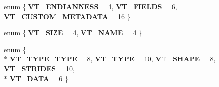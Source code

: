 \begin{DoxyCompactItemize}
\item 
enum \{ {\bfseries V\+T\+\_\+\+E\+N\+D\+I\+A\+N\+N\+E\+SS} = 4, 
{\bfseries V\+T\+\_\+\+F\+I\+E\+L\+DS} = 6, 
{\bfseries V\+T\+\_\+\+C\+U\+S\+T\+O\+M\+\_\+\+M\+E\+T\+A\+D\+A\+TA} = 16
 \}\hypertarget{structorg_1_1apache_1_1arrow_1_1flatbuf_1_1FLATBUFFERS__FINAL__CLASS_ae011c1116f06df235fe2242e20bdbc9e}{}\label{structorg_1_1apache_1_1arrow_1_1flatbuf_1_1FLATBUFFERS__FINAL__CLASS_ae011c1116f06df235fe2242e20bdbc9e}

\item 
enum \{ {\bfseries V\+T\+\_\+\+S\+I\+ZE} = 4, 
{\bfseries V\+T\+\_\+\+N\+A\+ME} = 4
 \}\hypertarget{structorg_1_1apache_1_1arrow_1_1flatbuf_1_1FLATBUFFERS__FINAL__CLASS_af1f6807f98fcb7496e1d9eed8ef64f65}{}\label{structorg_1_1apache_1_1arrow_1_1flatbuf_1_1FLATBUFFERS__FINAL__CLASS_af1f6807f98fcb7496e1d9eed8ef64f65}

\item 
enum \{ \\*
{\bfseries V\+T\+\_\+\+T\+Y\+P\+E\+\_\+\+T\+Y\+PE} = 8, 
{\bfseries V\+T\+\_\+\+T\+Y\+PE} = 10, 
{\bfseries V\+T\+\_\+\+S\+H\+A\+PE} = 8, 
{\bfseries V\+T\+\_\+\+S\+T\+R\+I\+D\+ES} = 10, 
\\*
{\bfseries V\+T\+\_\+\+D\+A\+TA} = 6
 \}\hypertarget{structorg_1_1apache_1_1arrow_1_1flatbuf_1_1FLATBUFFERS__FINAL__CLASS_a3ede0116fa958f3c517fae8cc7a1e84e}{}\label{structorg_1_1apache_1_1arrow_1_1flatbuf_1_1FLATBUFFERS__FINAL__CLASS_a3ede0116fa958f3c517fae8cc7a1e84e}

\end{DoxyCompactItemize}
